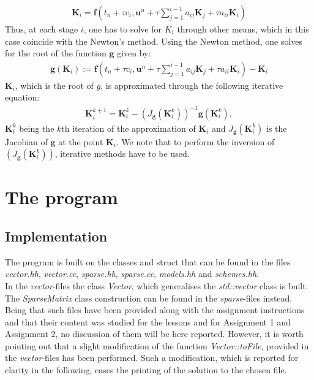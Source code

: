 \documentclass[11pt]{article}
\theoremstyle{theorem}
\theoremstyle{definition}
\begin{document}
\begin{align}
\label{eqn:K_i}
\mathbf{K}_i = \mathbf{f}\left(t_n + \tau c_i, \mathbf{u}^n + \tau\sum_{j=1}^{i-1}a_{ij}\mathbf{K}_j + \tau a_{ii}\mathbf{K}_i\right)
\end{align}
Thus, at each stage $ i $, one has to solve for $ K_i $ through other means, which in this case coincide with the Newton's method. Using the Newton method, one solves for the root of the function $ \mathbf{g} $ given by:
\begin{align*}
\mathbf{g}(\mathbf{K}_i) := \mathbf{f}\left(t_n + \tau c_i, \mathbf{u}^n + \tau\sum_{j=1}^{i-1}a_{ij}\mathbf{K}_j + \tau a_{ii}\mathbf{K}_i\right) - \mathbf{K}_i
\end{align*}
$\mathbf{K}_i $, which is the root of $g$, is approximated through the following iterative equation:
\begin{align*}
\mathbf{K}_i^{k+1} = \mathbf{K}_i^{k} - (J_\mathbf{g}(\mathbf{K}_{i}^{k}))^{-1}\mathbf{g}(\mathbf{K}_{i}^{k}),
\end{align*}
$ \mathbf{K}_i^k $ being the $ k $th iteration of the approximation of $ \mathbf{K}_i $ and $J_\mathbf{g}(\mathbf{K}_{i}^{k})$ is the Jacobian of $\mathbf{g}$ at the point $\mathbf{K}_i$. We note that to perform the inversion of $(J_\mathbf{g}(\mathbf{K}_{i}^{k})) $, iterative methods have to be used.\\



\section{The program}
\subsection{Implementation}
The program is built on the classes and struct that can be found in the files \emph{vector.hh}, \emph{vector.cc}, \emph{sparse.hh}, \emph{sparse.cc}, \emph{models.hh} and \emph{schemes.hh}.\\
In the \emph{vector}-files the class \emph{Vector}, which generalises the \emph{std::vector} class is built. The \emph{SparseMatrix} class construction can be found in the \emph{sparse}-files instead. Being that such files have been provided along with the assignment instructions and that their content was studied for the lessons and for Assignment 1 and Assignment 2, no discussion of them will be here reported. However, it is worth pointing out that a slight modification of the function \emph{Vector::toFile}, provided in the \emph{vector}-files has been performed. Such a modification, which is reported for clarity in the following, eases the printing of the solution to the chosen file.\\
\end{document}
